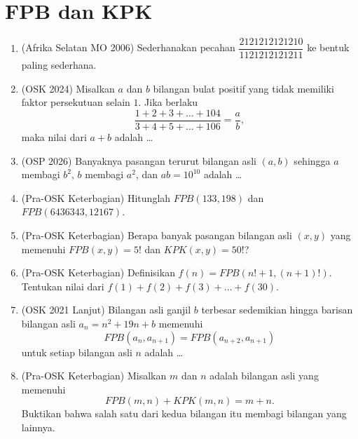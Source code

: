\documentclass[12pt]{scrartcl}
\begin{document}
\section{FPB dan KPK}
\begin{enumerate}[resume]

	\item (Afrika Selatan MO 2006)
	Sederhanakan pecahan $\dfrac{2121212121210}{1121212121211}$ ke bentuk paling sederhana.

	\item (OSK 2024)
	Misalkan $a$ dan $b$ bilangan bulat positif yang tidak memiliki faktor persekutuan selain $1$.
	Jika berlaku
	\[ \frac{1 + 2 + 3 + \dots + 104}{3 + 4 + 5 + \dots + 106} = \frac{a}{b}, \]
	maka nilai dari $a + b$ adalah \dots

	\item (OSP 2026)
	Banyaknya pasangan terurut bilangan asli $(a, b)$ sehingga $a$ membagi $b^2$,
	$b$ membagi $a^2$, dan $ab = 10^{10}$ adalah \dots

	\item (Pra-OSK Keterbagian)
	Hitunglah $FPB(133, 198)$ dan $FPB(6436343, 12167)$.

	\item (Pra-OSK Keterbagian)
	Berapa banyak pasangan bilangan asli $(x, y)$ yang memenuhi
	$FPB(x, y) = 5!$ dan $KPK(x, y) = 50!$?

	\item (Pra-OSK Keterbagian)
	Definisikan $f(n) = FPB(n! + 1, (n + 1)!)$.
	Tentukan nilai dari $f(1) + f(2) + f(3) + \dots + f(30)$.

	\item (OSK 2021 Lanjut)
	Bilangan asli ganjil $b$ terbesar sedemikian hingga barisan bilangan asli
	$a_n = n^2 + 19n + b$ memenuhi
	\[ FPB(a_n, a_{n + 1}) = FPB(a_{n + 2}, a_{n + 1}) \]
	untuk setiap bilangan asli $n$ adalah \dots

	\item (Pra-OSK Keterbagian)
	Misalkan $m$ dan $n$ adalah bilangan asli yang memenuhi
	\[ FPB(m, n) + KPK(m, n) = m + n. \]
	Buktikan bahwa salah satu dari kedua bilangan itu membagi bilangan yang lainnya.


\end{enumerate}
\end{document}
